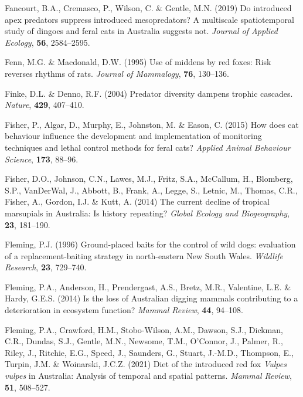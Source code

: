 \documentclass[11pt,a4paper,titlepage,twoside,openright]{style/unimelbthesis}
\begin{document}
\begin{mainmatter}
\leavevmode\hypertarget{ref-fancourt2019introduced}{}%
Fancourt, B.A., Cremasco, P., Wilson, C. \& Gentle, M.N. (2019) Do introduced apex predators suppress introduced mesopredators? A multiscale spatiotemporal study of dingoes and feral cats in Australia suggests not. \emph{Journal of Applied Ecology}, \textbf{56}, 2584--2595.

\leavevmode\hypertarget{ref-fenn1995use}{}%
Fenn, M.G. \& Macdonald, D.W. (1995) Use of middens by red foxes: Risk reverses rhythms of rats. \emph{Journal of Mammalogy}, \textbf{76}, 130--136.

\leavevmode\hypertarget{ref-finke2004predator}{}%
Finke, D.L. \& Denno, R.F. (2004) Predator diversity dampens trophic cascades. \emph{Nature}, \textbf{429}, 407--410.

\leavevmode\hypertarget{ref-fisher2015cat}{}%
Fisher, P., Algar, D., Murphy, E., Johnston, M. \& Eason, C. (2015) How does cat behaviour influence the development and implementation of monitoring techniques and lethal control methods for feral cats? \emph{Applied Animal Behaviour Science}, \textbf{173}, 88--96.

\leavevmode\hypertarget{ref-fisher2014current}{}%
Fisher, D.O., Johnson, C.N., Lawes, M.J., Fritz, S.A., McCallum, H., Blomberg, S.P., VanDerWal, J., Abbott, B., Frank, A., Legge, S., Letnic, M., Thomas, C.R., Fisher, A., Gordon, I.J. \& Kutt, A. (2014) The current decline of tropical marsupials in Australia: Is history repeating? \emph{Global Ecology and Biogeography}, \textbf{23}, 181--190.

\leavevmode\hypertarget{ref-fleming1996ground}{}%
Fleming, P.J. (1996) Ground-placed baits for the control of wild dogs: evaluation of a replacement-baiting strategy in north-eastern New South Wales. \emph{Wildlife Research}, \textbf{23}, 729--740.

\leavevmode\hypertarget{ref-fleming2014loss}{}%
Fleming, P.A., Anderson, H., Prendergast, A.S., Bretz, M.R., Valentine, L.E. \& Hardy, G.E.S. (2014) Is the loss of Australian digging mammals contributing to a deterioration in ecosystem function? \emph{Mammal Review}, \textbf{44}, 94--108.

\leavevmode\hypertarget{ref-fleming2021diet}{}%
Fleming, P.A., Crawford, H.M., Stobo-Wilson, A.M., Dawson, S.J., Dickman, C.R., Dundas, S.J., Gentle, M.N., Newsome, T.M., O'Connor, J., Palmer, R., Riley, J., Ritchie, E.G., Speed, J., Saunders, G., Stuart, J.-M.D., Thompson, E., Turpin, J.M. \& Woinarski, J.C.Z. (2021) Diet of the introduced red fox \emph{Vulpes vulpes} in Australia: Analysis of temporal and spatial patterns. \emph{Mammal Review}, \textbf{51}, 508--527.


\end{mainmatter}
\end{document}
